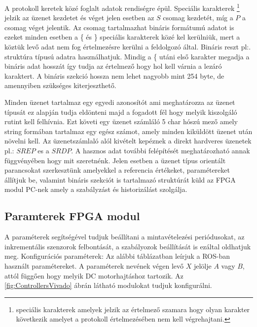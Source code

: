 \renewcommand{\img}{SajatRobot/FPGAmodulok/ProtokolDiagram.jpg}
\renewcommand{\sources}{*}
\renewcommand{\captionn}{FPGA komunikacios protokol altalanos csomag szerkezet}
\renewcommand{\figlabel}{FPGAComCsomagAlt}



A protokoll keretek közé foglalt adatok rendiségre épül. Speciális karakterek \footnote{speciális karakterek amelyek jelzik az értelmező szamara hogy olyan karakter következik amelyet a protokoll értelmezésében nem kell végrehajtani.} jelzik az üzenet kezdetet és véget jelen esetben az $S$ csomag kezdetét, míg a $P$ a csomag véget jelentik.
Az csomag tartalmazhat bináris formátumú adatot is ezeket minden esetben a \{ és \} speciális karakterek közé kel kerülniük, mert a köztük levő adat nem fog értelmezésre kerülni a feldolgozó által. Bináris reszt  pl:. struktúra típusú adatra használhatjuk. Mindig a \{ utáni első karakter megadja a bináris adat hosszát így tudja az értelmező hogy hol kell várnia a lezáró karaktert. A bináris szekció hossza nem lehet nagyobb mint 254 byte, de amennyiben szükséges kiterjeszthető.

Minden üzenet tartalmaz egy egyedi azonosítót ami meghatározza az üzenet típusát ez alapján tudja eldönteni majd a fogadott fél hogy melyik kiszolgáló rutint kell felhívnia. Ezt követi egy üzenet számláló 5 char hószú mező amely string formában tartalmaz egy egész számot, amely minden kiküldött üzenet után növelni kell. Az üzenetszámlaló alól kivételt kepéznek a direkt hardveres üzenetek pl.: $SREP$ es a $SRDP$.
A hasznos adat további felépítését meghatározható annak függvényében hogy mit szeretnénk. Jelen esetben a üzenet típus orientált parancsokat szerkesztünk amelyekkel a referencia értékeket, paramétereket állítjuk be, valamint bináris szekciót is tartalmazó struktúrát küld az FPGA modul PC-nek amely a szabályzást és historizálást szolgálja.

\subsection{Paramterek FPGA modul}

A paraméterek segítségével tudjuk beállítani a mintavételezési periódusokat, az inkrementális szenzorok felbontását, a szabályozok beállítását is ezáltal oldhatjuk meg.
Konfigurációs paraméterek:
Az alábbi táblázatban leírjuk a ROS-ban használt paramétereket. A paraméterek nevének végen levő $X$ jelölje $A$ vagy $B$, attól függően hogy melyik DC motorhajtáshoz tartozik. Az \ref{fig:ControllersVivado} ábrán látható modulokat tudjuk konfigurálni.


